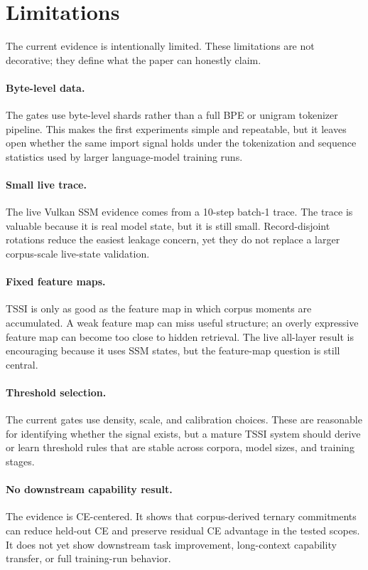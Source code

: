 \documentclass{article}
\begin{document}
\section{Limitations}

The current evidence is intentionally limited. These limitations are not
decorative; they define what the paper can honestly claim.

\paragraph{Byte-level data.}
The gates use byte-level shards rather than a full BPE or unigram tokenizer
pipeline. This makes the first experiments simple and repeatable, but it leaves
open whether the same import signal holds under the tokenization and sequence
statistics used by larger language-model training runs.

\paragraph{Small live trace.}
The live Vulkan SSM evidence comes from a 10-step batch-1 trace. The trace is
valuable because it is real model state, but it is still small. Record-disjoint
rotations reduce the easiest leakage concern, yet they do not replace a larger
corpus-scale live-state validation.

\paragraph{Fixed feature maps.}
TSSI is only as good as the feature map in which corpus moments are accumulated.
A weak feature map can miss useful structure; an overly expressive feature map
can become too close to hidden retrieval. The live all-layer result is
encouraging because it uses SSM states, but the feature-map question is still
central.

\paragraph{Threshold selection.}
The current gates use density, scale, and calibration choices. These are
reasonable for identifying whether the signal exists, but a mature TSSI system
should derive or learn threshold rules that are stable across corpora, model
sizes, and training stages.

\paragraph{No downstream capability result.}
The evidence is CE-centered. It shows that corpus-derived ternary commitments
can reduce held-out CE and preserve residual CE advantage in the tested scopes.
It does not yet show downstream task improvement, long-context capability
transfer, or full training-run behavior.
\end{document}
